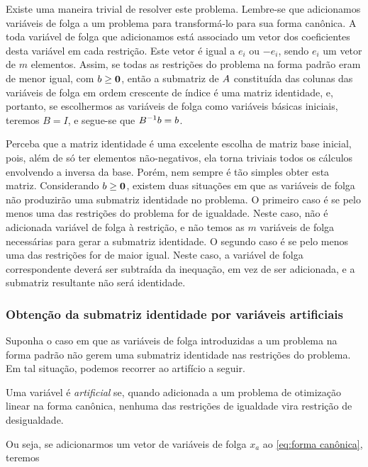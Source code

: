 Existe uma maneira trivial de resolver este problema. Lembre-se que adicionamos variáveis de folga a um problema para transformá-lo para sua forma canônica. A toda variável de folga que adicionamos está associado um vetor dos coeficientes desta variável em cada restrição. Este vetor é igual a $ e_i$ ou $- e_i$, sendo $ e_i$ um vetor de $m$ elementos. Assim, se todas as restrições do problema na forma padrão eram de menor igual, com $b \geq \vb 0$, então a submatriz de $A$ constituída das colunas das variáveis de folga em ordem crescente de índice é uma matriz identidade, e, portanto, se escolhermos as variáveis de folga como variáveis básicas iniciais, teremos $ B = I$, e segue-se que $B^{-1}b = b$.

Perceba que a matriz identidade é uma excelente escolha de matriz base inicial, pois, além de só ter elementos não-negativos, ela torna triviais todos os cálculos envolvendo a inversa da base. Porém, nem sempre é tão simples obter esta matriz. Considerando $b \geq \vb 0$, existem duas situações em que as variáveis de folga não produzirão uma submatriz identidade no problema. O primeiro caso é se pelo menos uma das restrições do problema for de igualdade. Neste caso, não é adicionada variável de folga à restrição, e não temos as $m$ variáveis de folga necessárias para gerar a submatriz identidade. O segundo caso é se pelo menos uma das restrições for de maior igual. Neste caso, a variável de folga correspondente deverá ser subtraída da inequação, em vez de ser adicionada, e a submatriz resultante não será identidade.

\subsubsection{Obtenção da submatriz identidade por variáveis artificiais}\label{sec:variáveis artificiais}
Suponha o caso em que as variáveis de folga introduzidas a um problema na forma padrão não gerem uma submatriz identidade nas restrições do problema. Em tal situação, podemos recorrer ao artifício a seguir.

\begin{mydef}
    Uma variável é \emph{artificial} se, quando adicionada a um problema de otimização linear na forma canônica, nenhuma das restrições de igualdade vira restrição de desigualdade.
\end{mydef}

Ou seja, se adicionarmos um vetor de variáveis de folga $x_{a}$ ao \cref{eq:forma canônica}, teremos

